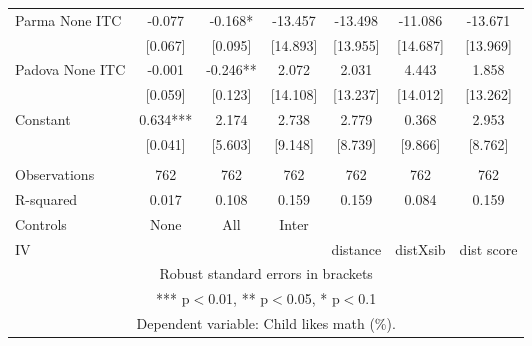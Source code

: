 \begin{tabular}{lcccccc}
Parma None ITC & -0.077 & -0.168* & -13.457 & -13.498 & -11.086 & -13.671 \\
 & [0.067] & [0.095] & [14.893] & [13.955] & [14.687] & [13.969] \\
Padova None ITC & -0.001 & -0.246** & 2.072 & 2.031 & 4.443 & 1.858 \\
 & [0.059] & [0.123] & [14.108] & [13.237] & [14.012] & [13.262] \\
Constant & 0.634*** & 2.174 & 2.738 & 2.779 & 0.368 & 2.953 \\
 & [0.041] & [5.603] & [9.148] & [8.739] & [9.866] & [8.762] \\
 &  &  &  &  &  &  \\
Observations & 762 & 762 & 762 & 762 & 762 & 762 \\
R-squared & 0.017 & 0.108 & 0.159 & 0.159 & 0.084 & 0.159 \\
Controls & None & All & Inter &  &  &  \\
 IV &  &  &  & distance & distXsib & dist score \\ \hline
\multicolumn{7}{c}{ Robust standard errors in brackets} \\
\multicolumn{7}{c}{ *** p$<$0.01, ** p$<$0.05, * p$<$0.1} \\
\multicolumn{7}{c}{ Dependent variable: Child likes math (\%).} \\
\end{tabular}

